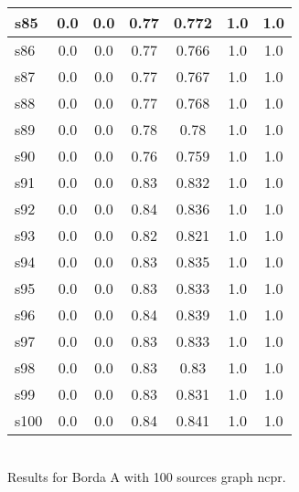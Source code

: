 \documentclass{article}
\begin{document}
\begin{tabular}{|l|c|c|c|c|c|c|}
\hline
s85 &0.0 & 0.0 & 0.77 & 0.772 & 1.0 & 1.0\\
\hline
s86 &0.0 & 0.0 & 0.77 & 0.766 & 1.0 & 1.0\\
\hline
s87 &0.0 & 0.0 & 0.77 & 0.767 & 1.0 & 1.0\\
\hline
s88 &0.0 & 0.0 & 0.77 & 0.768 & 1.0 & 1.0\\
\hline
s89 &0.0 & 0.0 & 0.78 & 0.78 & 1.0 & 1.0\\
\hline
s90 &0.0 & 0.0 & 0.76 & 0.759 & 1.0 & 1.0\\
\hline
s91 &0.0 & 0.0 & 0.83 & 0.832 & 1.0 & 1.0\\
\hline
s92 &0.0 & 0.0 & 0.84 & 0.836 & 1.0 & 1.0\\
\hline
s93 &0.0 & 0.0 & 0.82 & 0.821 & 1.0 & 1.0\\
\hline
s94 &0.0 & 0.0 & 0.83 & 0.835 & 1.0 & 1.0\\
\hline
s95 &0.0 & 0.0 & 0.83 & 0.833 & 1.0 & 1.0\\
\hline
s96 &0.0 & 0.0 & 0.84 & 0.839 & 1.0 & 1.0\\
\hline
s97 &0.0 & 0.0 & 0.83 & 0.833 & 1.0 & 1.0\\
\hline
s98 &0.0 & 0.0 & 0.83 & 0.83 & 1.0 & 1.0\\
\hline
s99 &0.0 & 0.0 & 0.83 & 0.831 & 1.0 & 1.0\\
\hline
s100 &0.0 & 0.0 & 0.84 & 0.841 & 1.0 & 1.0\\
\hline
\end{tabular}\\

\noindent Results for Borda A with 100 sources graph ncpr.
\end{document}
